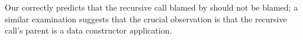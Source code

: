 Our \dectree correctly predicts that the recursive call blamed by
\sherrloc should not be blamed; a similar examination suggests that the
crucial observation is that the recursive call's parent is a data
constructor application.
%








